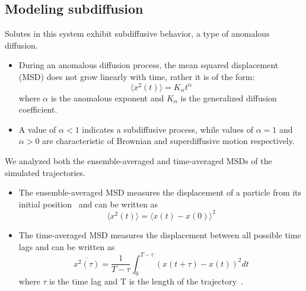 \documentclass{article}
\begin{document}

  \subsection{Modeling subdiffusion}\label{method:model_sFBM}

  Solutes in this system exhibit subdiffusive behavior, a type of anomalous diffusion.
  \begin{itemize}
  	\item During an anomalous diffusion process, the mean squared displacement (MSD)
  	does not grow linearly with time, rather it is of the form:
	\begin{equation} 
	\langle x^2(t) \rangle = K_{\alpha}t^\alpha
	\label{eqn:msd_form}
	\end{equation} 
	where $\alpha$ is the anomalous exponent and $K_\alpha$ is the
	generalized diffusion coefficient.
	\item A value of $\alpha < 1$ indicates a subdiffusive process, while values of
	$\alpha = 1$ and $\alpha > 0$ are characteristic of Brownian and superdiffusive
	motion respectively.
  \end{itemize}

  \noindent We analyzed both the ensemble-averaged and time-averaged MSDs
  of the simulated trajectories.
  \begin{itemize}
	\item The ensemble-averaged MSD measures the displacement of a particle from its initial
	position~\cite{meroz_toolbox_2015} and can be written as
	\begin{equation}
	\langle x^2(t) \rangle = \langle x(t) - x(0) \rangle^2
	\label{eqn:ensemble_msd}
	\end{equation}
	\item The time-averaged MSD measures the displacement between all possible time lags
	and can be written as
	\begin{equation}
	\overline{x^2(\tau)} = \dfrac{1}{T - \tau}\int_{0}^{T - \tau} (x(t + \tau) - x(t))^2 dt
	\end{equation}
	where $\tau$ is the time lag and T is the length of the
	trajectory~\cite{meroz_toolbox_2015}. 
  \end{itemize}
  
\end{document}
